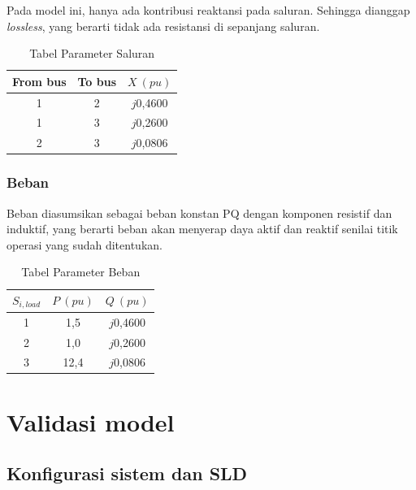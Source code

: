 Pada model ini, hanya ada kontribusi reaktansi pada saluran. Sehingga dianggap \textit{lossless}, yang berarti tidak ada resistansi di sepanjang saluran.

\begin{table}[ht]
	\caption{Tabel Parameter Saluran}
	\vspace{0.5em}
	\centering
	\begin{tabular}{|c|c|c|}
		\hline
		From bus & To bus & $\mathit{X \ (pu)}$ \\
		\hline
		1 & 2 & $\mathit{j}$0,4600 \\
		1 & 3 & $\mathit{j}$0,2600 \\
		2 & 3 & $\mathit{j}$0,0806 \\
		\hline
	\end{tabular}
	\label{Tab: tabel saluran}
\end{table}


\subsubsection{Beban}

Beban diasumsikan sebagai beban konstan PQ dengan komponen resistif dan induktif, yang berarti beban akan menyerap daya aktif dan reaktif senilai titik operasi yang sudah ditentukan.

\begin{table}[ht]
	\caption{Tabel Parameter Beban}
	\vspace{0.5em}
	\centering
	\begin{tabular}{|c|c|c|}
		\hline
		$\mathit{S_{i,load}}$ & $\mathit{P \ (pu)}$ & $\mathit{Q \ (pu)}$ \\
		\hline
		1 & 1,5 & $\mathit{j}$0,4600 \\
		2 & 1,0 & $\mathit{j}$0,2600 \\
		3 & 12,4 & $\mathit{j}$0,0806 \\
		\hline
	\end{tabular}
	\label{Tab: tabel beban}
\end{table}




\section{Validasi model}



\subsection{Konfigurasi sistem dan SLD}

